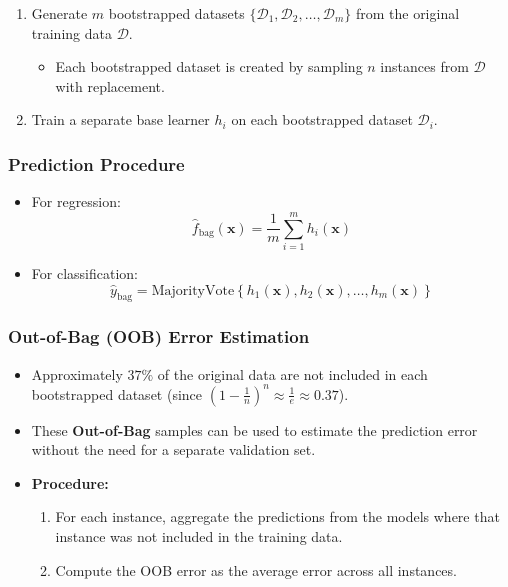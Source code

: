 \documentclass{article}
\begin{document}
\begin{enumerate}
    \item Generate $m$ bootstrapped datasets $\{\mathcal{D}_1, \mathcal{D}_2, \dots, \mathcal{D}_m\}$ from the original training data $\mathcal{D}$.
    \begin{itemize}
        \item Each bootstrapped dataset is created by sampling $n$ instances from $\mathcal{D}$ with replacement.
    \end{itemize}
    \item Train a separate base learner $h_i$ on each bootstrapped dataset $\mathcal{D}_i$.
\end{enumerate}

\subsubsection{Prediction Procedure}

\begin{itemize}
    \item For regression:
    \[
    \hat{f}_{\text{bag}}(\mathbf{x}) = \frac{1}{m} \sum_{i=1}^{m} h_i(\mathbf{x})
    \]
    \item For classification:
    \[
    \hat{y}_{\text{bag}} = \text{MajorityVote}\left\{ h_1(\mathbf{x}), h_2(\mathbf{x}), \dots, h_m(\mathbf{x}) \right\}
    \]
\end{itemize}

\subsubsection{Out-of-Bag (OOB) Error Estimation}

\begin{itemize}
    \item Approximately $37\%$ of the original data are not included in each bootstrapped dataset (since $(1 - \frac{1}{n})^n \approx \frac{1}{e} \approx 0.37$).
    \item These \textbf{Out-of-Bag} samples can be used to estimate the prediction error without the need for a separate validation set.
    \item \textbf{Procedure:}
    \begin{enumerate}
        \item For each instance, aggregate the predictions from the models where that instance was not included in the training data.
        \item Compute the OOB error as the average error across all instances.
    \end{enumerate}
\end{itemize}
\end{document}
